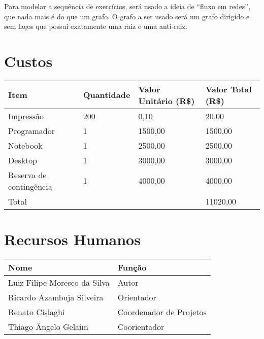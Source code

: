 \documentclass[12pt]{article}
\begin{document}
        Para modelar a sequência de exercícios, será usado a ideia de ``fluxo em redes'', que nada
        mais é do que um grafo. O grafo a ser usado será um grafo dirigido e sem laços que possui
        exatamente uma raiz e uma anti-raiz.

\newpage
\section{Custos}
    \begin{tabular}{l l l l}
        \hline
        Item                    &   Quantidade  &   Valor Unitário (R\$)    &   Valor Total (R\$) \\
        \hline
        Impressão               &   200         &   0,10                    &   20,00             \\

        Programador             &   1           &   1500,00                 &   1500,00           \\
        Notebook                &   1           &   2500,00                 &   2500,00           \\
        Desktop                 &   1           &   3000,00                 &   3000,00           \\
        Reserva de contingência &   1           &   4000,00                 &   4000,00           \\
        \hline
        Total                   &               &                           &   11020,00
    \end{tabular}

\newpage
\section{Recursos Humanos}
    \begin{tabular}{l l}
        \hline
        Nome                            & Função                  \\
        \hline
        Luiz Filipe Moresco da Silva    & Autor                   \\
        Ricardo Azambuja Silveira       & Orientador              \\
        Renato Cislaghi                 & Coordenador de Projetos \\
        Thiago Ângelo Gelaim            & Coorientador            \\
        \hline
    \end{tabular}
    \\
    \\
\end{document}
